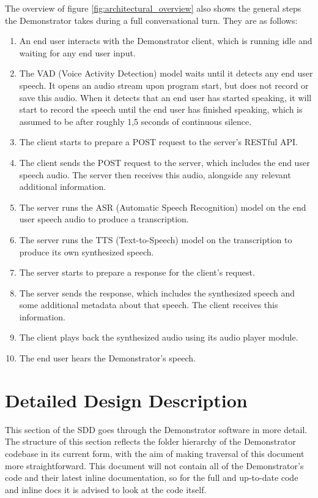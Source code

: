 The overview of figure \ref{fig:architectural_overview} also shows the general steps the Demonstrator takes during a full conversational turn.
They are as follows:
\begin{enumerate}
    \item An end user interacts with the Demonstrator client, which is running idle and waiting for any end user input.
    \item The VAD (Voice Activity Detection) model waits until it detects any end user speech. It opens an audio stream upon program start, but does not record or save this audio. When it detects that an end user has started speaking, it will start to record the speech until the end user has finished speaking, which is assumed to be after roughly 1,5 seconds of continuous silence.
    \item The client starts to prepare a POST request to the server's RESTful API.
    \item The client sends the POST request to the server, which includes the end user speech audio. The server then receives this audio, alongside any relevant additional information.
    \item The server runs the ASR (Automatic Speech Recognition) model on the end user speech audio to produce a transcription.
    \item The server runs the TTS (Text-to-Speech) model on the transcription to produce its own synthesized speech.
    \item The server starts to prepare a response for the client's request.
    \item The server sends the response, which includes the synthesized speech and some additional metadata about that speech. The client receives this information.
    \item The client plays back the synthesized audio using its audio player module.
    \item The end user hears the Demonstrator's speech.
\end{enumerate}

\chapter{Detailed Design Description}
This section of the SDD goes through the Demonstrator software in more detail.
The structure of this section reflects the folder hierarchy of the Demonstrator codebase in its current form, with the aim of making traversal of this document more straightforward.
This document will not contain all of the Demonstrator's code and their latest inline documentation, so for the full and up-to-date code and inline docs it is advised to look at the code itself.

